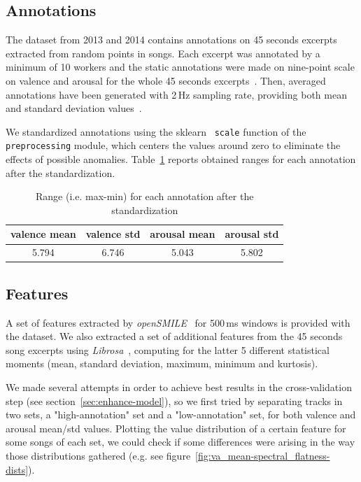 \subsection{Annotations}\label{sec:annotations}

The dataset from 2013 and 2014 contains annotations on 45 seconds excerpts extracted from random points in songs. Each excerpt was annotated by a minimum of 10 workers and the static annotations were made on nine-point scale on valence and arousal for the whole 45 seconds excerpts~\cite{aljanaki2017developing}.
Then, averaged annotations have been generated with 2\,Hz sampling rate, providing both mean and standard deviation values~\cite{soleymani2016deam}.

We standardized annotations using the sklearn~\cite{scikit-learn} \texttt{scale} function of the \texttt{preprocessing} module, which centers the values around zero to eliminate the effects of possible anomalies. Table~\ref{table:annot-ranges} reports obtained ranges for each annotation after the standardization.

\begin{table}[h]
	\centering
	\begin{tabular}{cccc}
		\toprule
		valence mean & valence std & arousal mean & arousal std \\
		\midrule
		5.794 & 6.746 & 5.043 & 5.802 \\
		\bottomrule
	\end{tabular}
	\caption{Range (i.e. max-min) for each annotation after the standardization}
	\label{table:annot-ranges}
\end{table}


\subsection{Features}\label{sec:features}

A set of features extracted by \emph{openSMILE}~\cite{opensmile} for 500\,ms windows is provided with the dataset. We also extracted a set of additional features from the 45 seconds song excerpts using \emph{Librosa}~\cite{librosa}, computing for the latter 5 different statistical moments (mean, standard deviation, maximum, minimum and kurtosis).

We made several attempts in order to achieve best results in the cross-validation step (see section~\ref{sec:enhance-model}), so we first tried by separating tracks in two sets, a "high-annotation" set and a "low-annotation" set, for both valence and arousal mean/std values. Plotting the value distribution of a certain feature for some songs of each set, we could check if some differences were arising in the way those distributions gathered (e.g. see figure~\ref{fig:va_mean-spectral_flatness-dists}).


